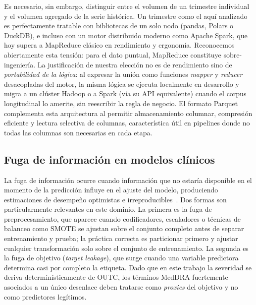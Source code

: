 \documentclass[12pt,a4paper]{article}
\begin{document}
Es necesario, sin embargo, distinguir entre el volumen de un trimestre individual y el volumen agregado de la serie histórica. Un trimestre como el aquí analizado es perfectamente tratable con bibliotecas de un solo nodo (pandas, Polars o DuckDB), e incluso con un motor distribuido moderno como Apache Spark, que hoy supera a MapReduce clásico en rendimiento y ergonomía. Reconocemos abiertamente esta tensión: para el dato puntual, MapReduce constituye sobre-ingeniería. La justificación de nuestra elección no es de rendimiento sino de \textit{portabilidad de la lógica}: al expresar la unión como funciones \textit{mapper} y \textit{reducer} desacopladas del motor, la misma lógica se ejecuta localmente en desarrollo y migra a un clúster Hadoop o a Spark (vía su API equivalente) cuando el corpus longitudinal lo amerite, sin reescribir la regla de negocio. El formato Parquet complementa esta arquitectura al permitir almacenamiento columnar, compresión eficiente y lectura selectiva de columnas, característica útil en pipelines donde no todas las columnas son necesarias en cada etapa.

\subsection{Fuga de información en modelos clínicos}
La fuga de información ocurre cuando información que no estaría disponible en el momento de la predicción influye en el ajuste del modelo, produciendo estimaciones de desempeño optimistas e irreproducibles~\cite{kaufman2012}. Dos formas son particularmente relevantes en este dominio. La primera es la fuga de preprocesamiento, que aparece cuando codificadores, escaladores o técnicas de balanceo como SMOTE se ajustan sobre el conjunto completo antes de separar entrenamiento y prueba; la práctica correcta es particionar primero y ajustar cualquier transformación solo sobre el conjunto de entrenamiento. La segunda es la fuga de objetivo (\textit{target leakage}), que surge cuando una variable predictora determina casi por completo la etiqueta. Dado que en este trabajo la severidad se deriva determinísticamente de OUTC, los términos MedDRA fuertemente asociados a un único desenlace deben tratarse como \textit{proxies} del objetivo y no como predictores legítimos.
\end{document}
